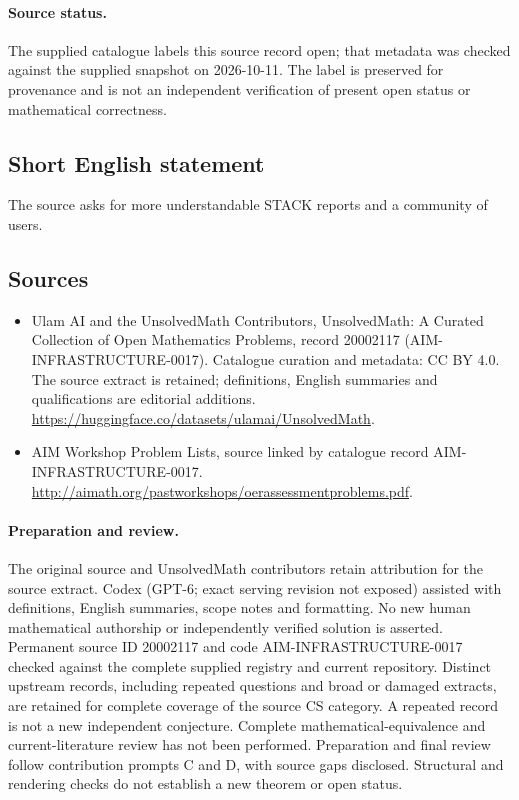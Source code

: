 \documentclass[11pt]{article}
\begin{document}
\paragraph{Source status.}
The supplied catalogue labels this source record open; that metadata was checked against the supplied snapshot on 2026-10-11. The label is preserved for provenance and is not an independent verification of present open status or mathematical correctness.
\subsection{Short English statement}
The source asks for more understandable STACK reports and a community of users.
\subsection{Sources}
\begin{itemize}
\item[\hypertarget{source:20002117:1}{S1}] Ulam AI and the UnsolvedMath Contributors, UnsolvedMath: A Curated Collection of Open Mathematics Problems, record 20002117 (AIM-INFRASTRUCTURE-0017). Catalogue curation and metadata: CC BY 4.0. The source extract is retained; definitions, English summaries and qualifications are editorial additions.
\url{https://huggingface.co/datasets/ulamai/UnsolvedMath}.
\item[\hypertarget{source:20002117:2}{S2}] AIM Workshop Problem Lists, source linked by catalogue record AIM-INFRASTRUCTURE-0017.
\url{http://aimath.org/pastworkshops/oerassessmentproblems.pdf}.
\end{itemize}
\paragraph{Preparation and review.}
The original source and UnsolvedMath contributors retain attribution for the source extract. Codex (GPT-6; exact serving revision not exposed) assisted with definitions, English summaries, scope notes and formatting. No new human mathematical authorship or independently verified solution is asserted. Permanent source ID 20002117 and code AIM-INFRASTRUCTURE-0017 checked against the complete supplied registry and current repository. Distinct upstream records, including repeated questions and broad or damaged extracts, are retained for complete coverage of the source CS category. A repeated record is not a new independent conjecture. Complete mathematical-equivalence and current-literature review has not been performed. Preparation and final review follow contribution prompts C and D, with source gaps disclosed. Structural and rendering checks do not establish a new theorem or open status.
\label{end:20002117}
\end{document}
